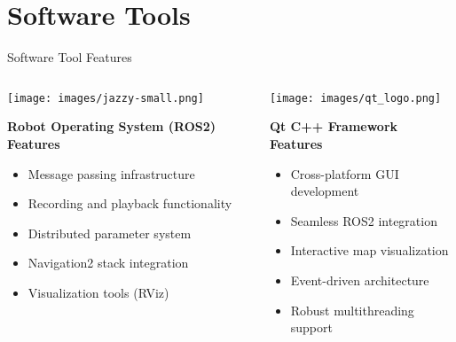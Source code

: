\documentclass[aspectratio=169]{beamer}
\newcommand{\reducefontsize}{\fontsize{7}{9}\selectfont}
\begin{document}
\section{Software Tools}

\begin{frame}{Software Tool Features}
	
		\begin{columns}
			\begin{column}{0.4\textwidth}
				\centering
					\texttt{[image: images/jazzy-small.png]}\\
        {\reducefontsize%
        \centering
				\textbf{Robot Operating System (ROS2) Features}
				\begin{itemize}
					\item Message passing infrastructure
					\item Recording and playback functionality
					\item Distributed parameter system
					\item Navigation2 stack integration
					\item Visualization tools (RViz)
				\end{itemize}
        }
			\end{column}
			\begin{column}{0.4\textwidth}
				\centering
					\texttt{[image: images/qt\_logo.png]}\\
				{\reducefontsize%
        \centering 
        \textbf{Qt C++ Framework Features} 
				\begin{itemize}
					\item Cross-platform GUI development
					\item Seamless ROS2 integration
					\item Interactive map visualization
					\item Event-driven architecture
					\item Robust multithreading support
				\end{itemize}
        }
			\end{column}
		\end{columns}


\end{frame}
\end{document}
